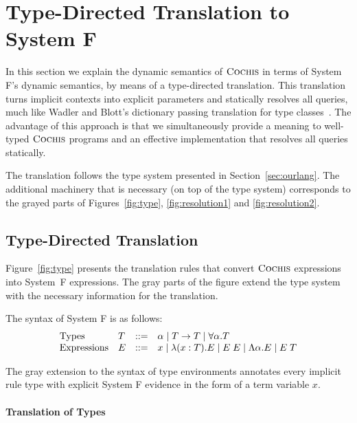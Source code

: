 \section{Type-Directed Translation to System F}
\label{sec:trans}

In this section we explain the dynamic semantics of $\textsc{Cochis}$ in terms
of System F's dynamic semantics, by means of a type-directed translation. 
This translation turns implicit contexts into explicit parameters and
statically resolves all queries, much like Wadler and Blott's dictionary
passing translation for type classes~\cite{adhoc}. 
The advantage of this approach is that we simultaneously provide a meaning to
well-typed $\textsc{Cochis}$ programs and an effective implementation that resolves
all queries statically.

The translation follows the type system presented in Section~\ref{sec:ourlang}.
The additional machinery that is necessary (on top of the type system)
corresponds to the grayed parts of Figures~\ref{fig:type}, \ref{fig:resolution1} and \ref{fig:resolution2}. 

\subsection{Type-Directed Translation}
Figure~\ref{fig:type} presents the translation rules that convert $\textsc{Cochis}$
expressions into System~F expressions. 
The gray parts of the figure extend the type system with the necessary
information for the translation.

The syntax of System F is as follows: 
{\small
  \[ \begin{array}{llrl}
    \text{Types} & T & ::= & \alpha \mid T \rightarrow T 
    \mid \forall \alpha. T \\ 
    \text{Expressions} & E & ::=  & x \mid \lambda (x:T) . E \mid E\;E
    \mid \Lambda \alpha . E \mid E\;T 
  \end{array} \]}

The gray extension to the syntax of type environments annotates every
implicit rule type with explicit System F evidence in the form of a 
term variable $x$.

\paragraph{Translation of Types}

